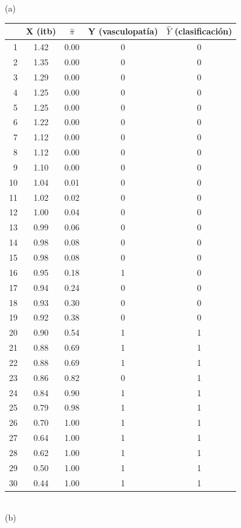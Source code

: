\begin{Ejemplo}
\begin{table}[btp]
\begin{center}
{\small	
	(a)\\[3mm]
\begin{tabular}{rcccc}
	\hline
\rule{0cm}{0.5cm}& X (itb) & $\hat{\pi}$ & Y (vasculopatía)& $\hat{Y}$ (clasificación) \\
	\hline
1 & 1.42 & 0.00 & 0 & 0 \\
2 & 1.35 & 0.00 & 0 & 0 \\
3 & 1.29 & 0.00 & 0 & 0 \\
4 & 1.25 & 0.00 & 0 & 0 \\
5 & 1.25 & 0.00 & 0 & 0 \\
6 & 1.22 & 0.00 & 0 & 0 \\
7 & 1.12 & 0.00 & 0 & 0 \\
8 & 1.12 & 0.00 & 0 & 0 \\
9 & 1.10 & 0.00 & 0 & 0 \\
10 & 1.04 & 0.01 & 0 & 0 \\
11 & 1.02 & 0.02 & 0 & 0 \\
12 & 1.00 & 0.04 & 0 & 0 \\
13 & 0.99 & 0.06 & 0 & 0 \\
14 & 0.98 & 0.08 & 0 & 0 \\
15 & 0.98 & 0.08 & 0 & 0 \\
16 & 0.95 & 0.18 & 1 & 0 \\
17 & 0.94 & 0.24 & 0 & 0 \\
18 & 0.93 & 0.30 & 0 & 0 \\
19 & 0.92 & 0.38 & 0 & 0 \\
20 & 0.90 & 0.54 & 1 & 1 \\
21 & 0.88 & 0.69 & 1 & 1 \\
22 & 0.88 & 0.69 & 1 & 1 \\
23 & 0.86 & 0.82 & 0 & 1 \\
24 & 0.84 & 0.90 & 1 & 1 \\
25 & 0.79 & 0.98 & 1 & 1 \\
26 & 0.70 & 1.00 & 1 & 1 \\
27 & 0.64 & 1.00 & 1 & 1 \\
28 & 0.62 & 1.00 & 1 & 1 \\
29 & 0.50 & 1.00 & 1 & 1 \\
30 & 0.44 & 1.00 & 1 & 1 \\
	\hline
\end{tabular}\\[5mm]
(b)\\[3mm]

}
\end{center}
\end{table}
\end{Ejemplo}
